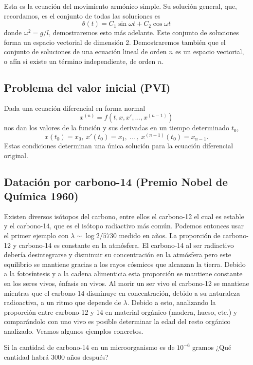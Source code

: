 \documentclass[../main.tex]{subfiles}
\begin{document}
Esta es la ecuación del movimiento armónico simple. Su solución general, que,
recordamos, es el conjunto de todas las soluciones es
\[\theta(t) = C_1 \sin \omega t + C_2 \cos \omega t\]
donde \(\omega^2 = g/l\), demostraremos esto más adelante. Este conjunto de
soluciones forma un espacio vectorial de dimensión 2. Demostraremos también que
el conjunto de soluciones de una ecuación lineal de orden \(n\) es un espacio
vectorial, o afín si existe un término independiente, de orden \(n\).

\subsection{Problema del valor inicial (PVI)}

Dada una ecuación diferencial en forma normal
\[x^{(n)} = f(t, x, x', \dots, x^{(n - 1)})\]
nos dan los valores de la función y sus derivadas en un tiempo determinado
\(t_0\),
\[x(t_0) = x_0,\ x'(t_0) = x_1,\ \dots\ ,\ x^{(n - 1)}(t_0) = x_{n - 1}.\]
Estas condiciones determinan una única solución para la ecuación diferencial
original.

\subsection{Datación por carbono-14 (Premio Nobel de Química 1960)}

Existen diversos isótopos del carbono, entre ellos el carbono-12 el cual es
estable y el carbono-14, que es el isótopo radiactivo más común. Podemos
entonces usar el primer ejemplo con \(\lambda \sim \log 2 / 5730\) medido en
años. La proporción de carbono-12 y carbono-14 es constante en la atmósfera. El
carbono-14 al ser radiactivo debería desintegrarse y disminuir su concentración
en la atmósfera pero este equilibrio se mantiene gracias a los rayos cósmicos
que alcanzan la tierra. Debido a la fotosíntesis y a la cadena alimenticia esta
proporción se mantiene constante en los seres vivos, énfasis en vivos. Al morir
un ser vivo el carbono-12 se mantiene mientras que el carbono-14 disminuye en
concentración, debido a su naturaleza radioactiva, a un ritmo que depende de
\(\lambda\). Debido a esto, analizando la proporción entre carbono-12 y 14 en
material orgánico (madera, hueso, etc.) y comparándolo con uno vivo es posible
determinar la edad del resto orgánico analizado. Veamos algunos ejemplos
concretos.

\begin{example}
	Si la cantidad de carbono-14 en un microorganismo es de \(10^{-6}\) gramos
	¿Qué cantidad habrá 3000 años después?
\end{example}
\end{document}
